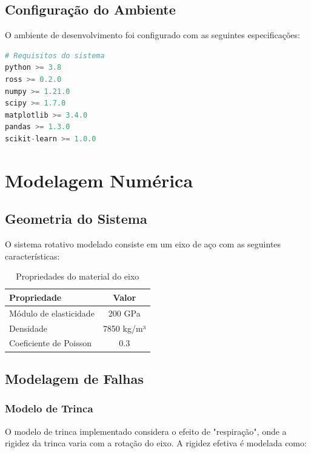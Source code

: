 \subsection{Configuração do Ambiente}

O ambiente de desenvolvimento foi configurado com as seguintes especificações:

\begin{lstlisting}[language=Python, caption=Configuração do ambiente Python]
# Requisitos do sistema
python >= 3.8
ross >= 0.2.0
numpy >= 1.21.0
scipy >= 1.7.0
matplotlib >= 3.4.0
pandas >= 1.3.0
scikit-learn >= 1.0.0
\end{lstlisting}

\section{Modelagem Numérica}

\subsection{Geometria do Sistema}

O sistema rotativo modelado consiste em um eixo de aço com as seguintes características:

\begin{table}[H]
    \centering
    \caption{Propriedades do material do eixo}
    \begin{tabular}{lc}
        \toprule
        Propriedade & Valor \\
        \midrule
        Módulo de elasticidade & 200 GPa \\
        Densidade & 7850 kg/m³ \\
        Coeficiente de Poisson & 0.3 \\
        \bottomrule
    \end{tabular}
    \label{tab:propriedades_material}
\end{table}

\subsection{Modelagem de Falhas}

\subsubsection{Modelo de Trinca}

O modelo de trinca implementado considera o efeito de "respiração", onde a rigidez da trinca varia com a rotação do eixo. A rigidez efetiva é modelada como:

